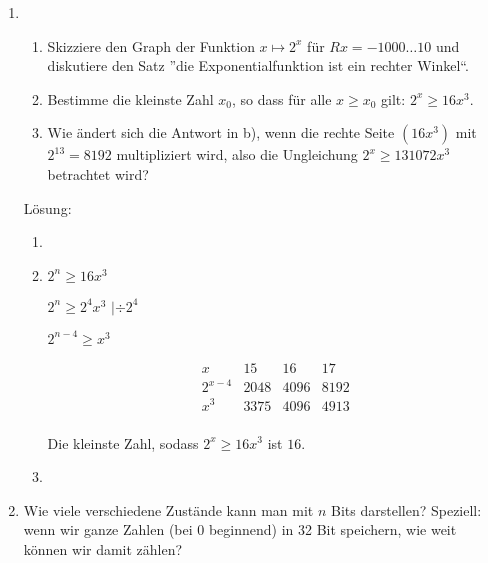 \documentclass[main.tex]{subfiles}
\begin{document}
\begin{enumerate}
\begin{enumerate}
	      \end{enumerate}
	\item \begin{enumerate}
		      \item Skizziere den Graph der Funktion \( x \mapsto 2^x \) für \(Rx = -1000 \dots 10 \)
		            und diskutiere den Satz ”die Exponentialfunktion ist ein rechter Winkel“.
		      \item Bestimme die kleinste Zahl \( x_0 \), so dass für alle \( x \geq x_0 \)
		            gilt: \( 2^x \geq 16x^3 \).
		      \item Wie ändert sich die Antwort in b),
		            wenn die rechte Seite \( (16x^3) \) mit \( 2^{13} = 8192 \)
		            multipliziert wird, also die Ungleichung \( 2^x \geq 131072 x^3 \) betrachtet wird?
	      \end{enumerate}

	      Lösung:
	      \begin{enumerate}
		      \item
		      \item \( 2^n \geq 16x^3 \)

		            \( 2^n \geq 2^4x^3 \) \( | \div 2^4 \)

		            \( 2^{n-4} \geq x^3 \)

		            \[ \begin{array}{c|ccc}
				            x         & 15   & 16   & 17   \\
				            \hline
				            2^{x - 4} & 2048 & 4096 & 8192 \\
				            x^3       & 3375 & 4096 & 4913 \\
			            \end{array} \]

		            Die kleinste Zahl, sodass \( 2^x \geq 16x^3 \) ist \( 16 \).
		      \item
	      \end{enumerate}
	\item Wie viele verschiedene Zustände kann man mit \( n \) Bits darstellen?
	      Speziell: wenn wir ganze Zahlen (bei 0 beginnend) in 32 Bit speichern,
	      wie weit können wir damit zählen?


\end{enumerate}
\end{document}

